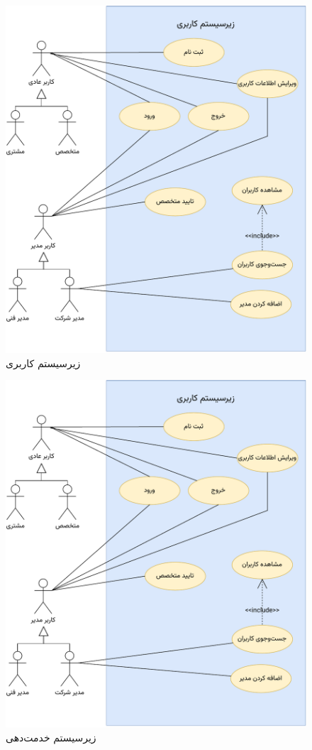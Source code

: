 \begin{figure}[ht!]
\centering
		\includegraphics[scale=0.8, page=1]{figs/usecase.pdf}
\caption{زیرسیستم کاربری}
\end{figure}

\FloatBarrier
\newpage


\begin{figure}
\centering
	\includegraphics[scale=0.8, page=2]{figs/usecase.pdf}
\caption{زیرسیستم خدمت‌دهی}
\end{figure}
\FloatBarrier
\newpage

